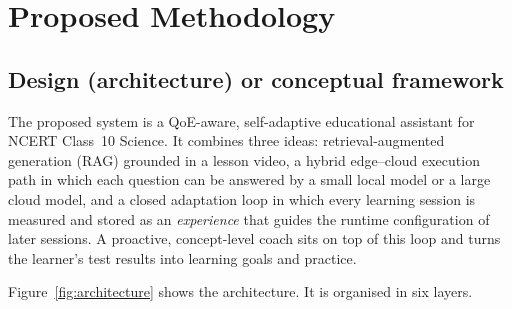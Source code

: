 
\chapter{Proposed Methodology}

\section{Design (architecture) or conceptual framework}

The proposed system is a QoE-aware, self-adaptive educational assistant for NCERT Class~10 Science. It combines
three ideas: retrieval-augmented generation (RAG) grounded in a lesson video, a hybrid edge--cloud execution path in
which each question can be answered by a small local model or a large cloud model, and a closed adaptation loop in
which every learning session is measured and stored as an \emph{experience} that guides the runtime configuration of
later sessions. A proactive, concept-level coach sits on top of this loop and turns the learner's test results into
learning goals and practice.

Figure~\ref{fig:architecture} shows the architecture. It is organised in six layers.

